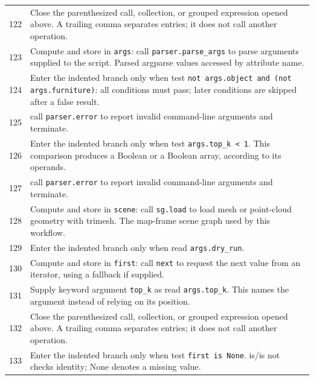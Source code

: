 \documentclass[11pt,a4paper]{book}
\begin{document}
\begin{longtable}{r p{}}
122 & Close the parenthesized call, collection, or grouped expression opened above. A trailing comma separates entries; it does not call another operation. \\

123 & Compute and store in \texttt{args}: call \texttt{parser.parse\_args} to parse arguments supplied to the script. Parsed argparse values accessed by attribute name. \\

124 & Enter the indented branch only when test \texttt{not args.object and (not args.furniture)}: all conditions must pass; later conditions are skipped after a false result. \\

125 & call \texttt{parser.error} to report invalid command-line arguments and terminate. \\

126 & Enter the indented branch only when test \texttt{args.top\_k < 1}. This comparison produces a Boolean or a Boolean array, according to its operands. \\

127 & call \texttt{parser.error} to report invalid command-line arguments and terminate. \\

128 & Compute and store in \texttt{scene}: call \texttt{sg.load} to load mesh or point-cloud geometry with trimesh. The map-frame scene graph used by this workflow. \\

129 & Enter the indented branch only when read \texttt{args.dry\_run}. \\

130 & Compute and store in \texttt{first}: call \texttt{next} to request the next value from an iterator, using a fallback if supplied.  \\

131 & Supply keyword argument \texttt{top\_k} as read \texttt{args.top\_k}. This names the argument instead of relying on its position. \\

132 & Close the parenthesized call, collection, or grouped expression opened above. A trailing comma separates entries; it does not call another operation. \\

133 & Enter the indented branch only when test \texttt{first is None}. is/is not checks identity; None denotes a missing value. \\


\end{longtable}
\end{document}
